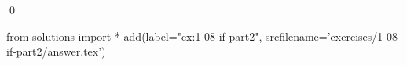 
\begin{ex}
  \label{ex:1-08-if-part2}
  
  \qed
\end{ex}
\begin{python0}
from solutions import *
add(label="ex:1-08-if-part2",
    srcfilename='exercises/1-08-if-part2/answer.tex')
\end{python0}
